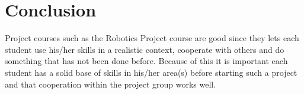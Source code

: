 \section{Conclusion}\label{sec:conclusion}
Project courses such as the Robotics Project course are good since they lets each student use his/her skills in a realistic context, cooperate with others and do something that has not been done before. Because of this it is important each student has a solid base of skills in his/her area(s) before starting such a project and that cooperation within the project group works well.

